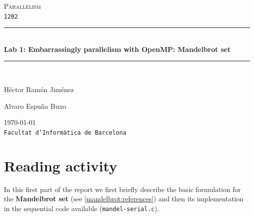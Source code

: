 \documentclass[a4paper,11pt]{article}
\begin{document}
\begin{titlepage}
\begin{center}
\textsc{\Large Parallelism}
\\
\texttt{1202}
\\[1.5cm]
\rule{\linewidth}{0.5mm}
\\[0.4cm]
{\huge
\bfseries
Lab 1: Embarrassingly parallelism with OpenMP: Mandelbrot set
\\[0.4cm]
}
\rule{\linewidth}{0.5mm}
\\[2.5cm]
\begin{minipage}{0.4\textwidth}
\begin{flushleft}
\large
Héctor Ramón Jiménez
\end{flushleft}
\end{minipage}
\begin{minipage}{0.4\textwidth}
\begin{flushright}
\large
Alvaro Espuña Buxo
\end{flushright}
\end{minipage}
\vfill
{\large
\today
}
\\
{\large
\texttt{Facultat d'Informàtica de Barcelona}
}
\end{center}
\end{titlepage}
\section{Reading activity}
In this first part of the report we first briefly describe the basic formulation for the \textbf{Mandelbrot set}
    (see \ref{mandelbrot:references}) and then its implementation in the sequential code available (\texttt{mandel-serial.c}).
\end{document}
